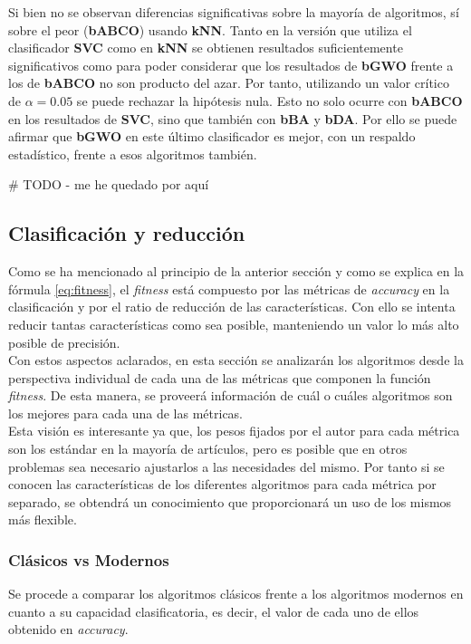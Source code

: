 Si bien no se observan diferencias significativas sobre la mayoría de algoritmos, sí sobre el peor (\textbf{bABCO}) usando \textbf{kNN}. Tanto en la versión que utiliza el clasificador \textbf{SVC} como en \textbf{kNN} se obtienen resultados suficientemente significativos como para poder considerar que los resultados de \textbf{bGWO} frente a los de \textbf{bABCO} no son producto del azar. Por tanto, utilizando un valor crítico de $\alpha=0.05$ se puede rechazar la hipótesis nula. Esto no solo ocurre con \textbf{bABCO} en los resultados de \textbf{SVC}, sino que también con \textbf{bBA} y \textbf{bDA}. Por ello se puede afirmar que \textbf{bGWO} en este último clasificador es mejor, con un respaldo estadístico, frente a esos algoritmos también.

# TODO - me he quedado por aquí

\subsection{Clasificación y reducción}
Como se ha mencionado al principio de la anterior sección y como se explica en la fórmula \ref{eq:fitness}, el \textit{fitness} está compuesto por las métricas de \textit{accuracy} en la clasificación y por el ratio de reducción de las características. Con ello se intenta reducir tantas características como sea posible, manteniendo un valor lo más alto posible de precisión.\\[6pt]
Con estos aspectos aclarados, en esta sección se analizarán los algoritmos desde la perspectiva individual de cada una de las métricas que componen la función \textit{fitness}. De esta manera, se proveerá información de cuál o cuáles algoritmos son los mejores para cada una de las métricas.\\[6pt]
Esta visión es interesante ya que, los pesos fijados por el autor para cada métrica son los estándar en la mayoría de artículos, pero es posible que en otros problemas sea necesario ajustarlos a las necesidades del mismo. Por tanto si se conocen las características de los diferentes algoritmos para cada métrica por separado, se obtendrá un conocimiento que proporcionará un uso de los mismos más flexible.

\subsubsection{Clásicos vs Modernos}
Se procede a comparar los algoritmos clásicos frente a los algoritmos modernos en cuanto a su capacidad clasificatoria, es decir, el valor de cada uno de ellos obtenido en \textit{accuracy}.\\[6pt]

